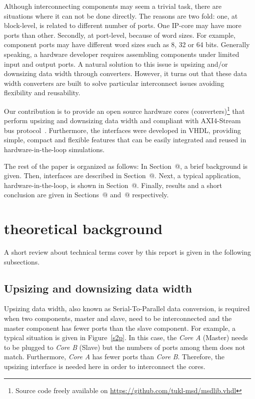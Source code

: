 \documentclass[10pt, conference, compsocconf]{IEEEtran}
\makeatletter
\newcommand{\rmnum}[1]{\expandafter\@slowromancap\romannumeral #1@}
\makeatother
\begin{document}
Although interconnecting components may seem a trivial task, there are situations where it can not be done directly. The reasons are two fold: one, at block-level, is related to different number of ports. One IP-core may have more ports than other. Secondly, at port-level, because of word sizes. For example, component ports may have different word sizes such as 8, 32 or 64 bits. Generally speaking, a
hardware developer requires assembling components under limited input and output ports. A natural solution to this issue is upsizing and/or downsizing data width through converters. However, it turns out that these data width converters are built to solve particular interconnect issues avoiding flexibility and reusability.

Our contribution is to provide an open source hardware cores (converters)\footnote{Source code freely available on \url{https://github.com/tukl-msd/msdlib.vhdl}} that perform upsizing and downsizing data width and compliant with AXI4-Stream bus protocol~\cite{AXI4}. Furthermore, the interfaces were developed in VHDL, providing simple, compact and flexible features that can be easily integrated and reused in hardware-in-the-loop simulations.

The rest of the paper is organized as follows: In Section~\rmnum{2}, a brief background is given. Then, interfaces are described in Section~\rmnum{3}. Next, a typical application, hardware-in-the-loop, is shown in Section~\rmnum{4}. Finally, results and a short conclusion are given in Sections~\rmnum{5} and~\rmnum{6} respectively.

\section{theoretical background}

A short review about technical terms cover by this report is given in the following subsections.

\subsection{Upsizing and downsizing data width}

Upsizing data width, also known as Serial-To-Parallel data conversion, is required when two components, master and slave, need to be interconnected and the master component has fewer ports than the slave component. For example, a typical situation is given in Figure~\ref{s2p}. In this case, the {\it Core A} (Master) needs to be plugged to {\it Core B} (Slave) but the numbers of ports among them does not match. Furthermore, {\it Core A} has fewer ports than {\it Core B}. Therefore, the upsizing interface is needed here in order to interconnect the cores.
\end{document}
